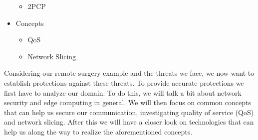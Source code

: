 \begin{itemize}
\begin{itemize}
        \item 2PCP
    \end{itemize}
    \item Concepts
    \begin{itemize}
        \item QoS
        \item Network Slicing
    \end{itemize}
\end{itemize}
\fi
Considering our remote surgery example and the threats we face, we now want to establish protections against these threats. To provide accurate protections we first have to analyze our domain. To do this, we will talk a bit about network security and edge computing in general. We will then focus on common concepts that can help us secure our communication, investigating quality of service (QoS) and network slicing. After this we will have a closer look on technologies that can help us along the way to realize the aforementioned concepts.


